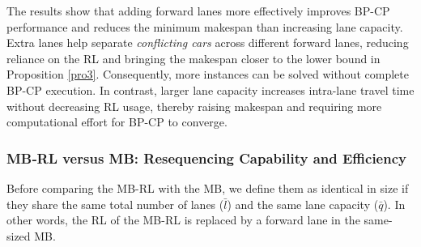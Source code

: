 \documentclass[12pt]{article}
\begin{document}

The results show that adding forward lanes more effectively improves BP-CP performance and reduces the minimum makespan than increasing lane capacity. Extra lanes help separate \textit{conflicting cars} across different forward lanes, reducing reliance on the RL and bringing the makespan closer to the lower bound in Proposition \ref{pro3}. Consequently, more instances can be solved without complete BP-CP execution. In contrast, larger lane capacity increases intra-lane travel time without decreasing RL usage, thereby raising makespan and requiring more computational effort for BP-CP to converge.


\subsubsection*{MB‑RL versus MB: Resequencing Capability and Efficiency}

Before comparing the MB-RL with the MB, we define them as identical in size if they share the same total number of lanes ($\bar{l}$) and the same lane capacity ($\bar{q}$). In other words, the RL of the MB-RL is replaced by a forward lane in the same-sized MB.
\end{document}
